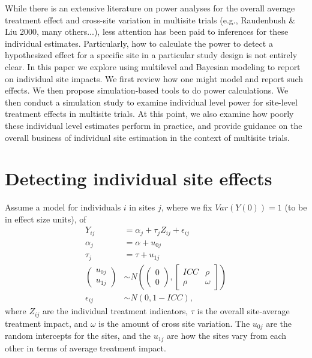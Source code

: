 \documentclass[]{article}
\begin{document}
While there is an extensive literature on power analyses for the overall average treatment effect and cross-site variation in multisite trials (e.g., Raudenbush \& Liu 2000, many others...), less attention has been paid to inferences for these individual estimates.
Particularly, how to calculate the power to detect a hypothesized effect for a specific site in a particular study design is not entirely clear.
In this paper we explore using multilevel and Bayesian modeling to report on individual site impacts.
We first review how one might model and report such effects.
We then propose simulation-based tools to do power calculations.
We then conduct a simulation study to examine individual level power for site-level treatment effects in multisite trials.
At this point, we also examine how poorly these individual level estimates perform in practice, and provide guidance on the overall business of individual site estimation in the context of multisite trials.


\section{Detecting individual site effects}

Assume a model for individuals $i$ in sites $j$, where we fix  $Var(Y(0)) = 1$ (to be in effect size units), of 
\begin{align*}
	Y_{ij} &= \alpha_j + \tau_j Z_{ij} + \epsilon_{ij} \\
	\alpha_j &= \alpha + u_{0j} \\
	\tau_j &= \tau + u_{1j} \\
	\begin{pmatrix}
		u_{0j} \\ u_{1j}
	\end{pmatrix} &\sim N\left(
	\begin{pmatrix}
		0 \\ 0
	\end{pmatrix}, 
	\begin{bmatrix}
		ICC & \rho \\ \rho & \omega
	\end{bmatrix}\right) \\
	\epsilon_{ij} &\sim N(0, 1-ICC) ,
\end{align*}
where $Z_{ij}$ are the individual treatment indicators, $\tau$ is the overall site-average treatment impact, and $\omega$ is the amount of cross site variation.
The $u_{0j}$ are the random intercepts for the sites, and the $u_{1j}$ are how the sites vary from each other in terms of average treatment impact.
\end{document}
